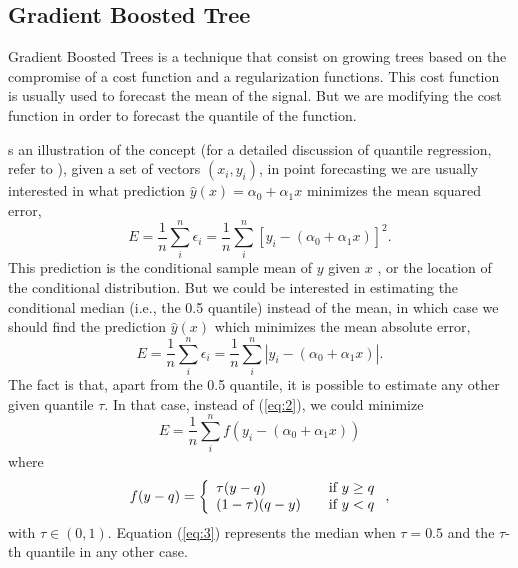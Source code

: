 \documentclass[a4paper,twocolumn,5p]{elsarticle}
\begin{document}
\subsection{Gradient Boosted Tree}

Gradient Boosted Trees is a technique that consist on growing trees based on the compromise 
of a cost function and a regularization functions. This cost function is usually used to forecast 
the mean of the signal. But we are modifying the cost function 
in order to forecast the quantile of the function. 

s an illustration of the concept (for a detailed discussion of 
quantile regression, refer to \cite{koenker_quantile_2005}), given a 
set of vectors $(x_i, y_i)$, in point forecasting we are usually 
interested in what prediction $\hat y(x) = \alpha_0 + \alpha_1 x$
minimizes the mean squared error,
\begin{equation}
  \label{eq:1}
  E = \frac{1}{n} \sum^n_i \epsilon_i =
  \frac{1}{n} \sum^n_i [ y_i - (\alpha_0 + \alpha_1 x) ]^2.
\end{equation}
This prediction is the conditional sample mean of $y$ given $x$%
, or the location of the conditional distribution. But we could be
interested in estimating the conditional median (i.e., the 0.5
quantile) instead of the mean, in which case we should find the
prediction $\hat y(x)$ which minimizes the mean absolute error,
\begin{equation}
  \label{eq:2}
  E = \frac{1}{n} \sum^n_i \epsilon_i =
  \frac{1}{n} \sum^n_i | y_i - (\alpha_0 + \alpha_1 x) |.
\end{equation}
The fact is that, apart from the 0.5 quantile, it is possible to
estimate any other given quantile $\tau$. In that case, instead of
(\ref{eq:2}), we could minimize
\begin{equation}
  \label{eq:3}
E= \frac{1}{n} \sum^n_i f( y_i - (\alpha_0 + \alpha_1 x))
\end{equation}
where
\begin{equation}
  \label{eq:4}
  f(y-q) = \left\{ 
\begin{array}{l l}
\tau (y-q) & \quad \mbox{if $y \ge q$}\\
(1-\tau) (q-y) & \quad \mbox{if $y < q$}\\
\end{array} \right.,
\end{equation}
with $\tau \in (0,1)$. Equation (\ref{eq:3}) represents the
median when $\tau=0.5$ and the $\tau$-th quantile in any other case.
\end{document}

